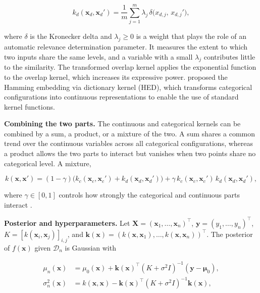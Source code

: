 \begin{equation}
  k_d(\boldsymbol{x}_d, \boldsymbol{x}_d') = \frac{1}{m} \sum_{j=1}^{m} \lambda_j \, \delta\big(x_{d,j},\, x_{d,j}'\big),
  \label{eq:kernel-discrete}
\end{equation}

where $\delta$ is the Kronecker delta and $\lambda_j \ge 0$ is a weight that plays the role of an automatic relevance determination parameter. It measures the extent to which two inputs share the same levels, and a variable with a small $\lambda_j$ contributes little to the similarity. The transformed overlap kernel \citep{pmlr-v139-wan21b} applies the exponential function to the overlap kernel, which increases its expressive power. \citet{pmlr-v206-deshwal23a} proposed the Hamming embedding via dictionary kernel (HED), which transforms categorical configurations into continuous representations to enable the use of standard kernel functions. %

\textbf{Combining the two parts.} The continuous and categorical kernels can be combined by a sum, a product, or a mixture of the two. A sum shares a common trend over the continuous variables across all categorical configurations, whereas a product allows the two parts to interact but vanishes when two points share no categorical level. A mixture,

\begin{equation}
  k(\boldsymbol{x}, \boldsymbol{x}') = (1-\gamma)\big(k_c(\boldsymbol{x}_c, \boldsymbol{x}_c') + k_d(\boldsymbol{x}_d, \boldsymbol{x}_d')\big) + \gamma\, k_c(\boldsymbol{x}_c, \boldsymbol{x}_c')\, k_d(\boldsymbol{x}_d, \boldsymbol{x}_d'),
  \label{eq:kernel-mixed}
\end{equation}

where $\gamma \in [0,1]$ controls how strongly the categorical and continuous parts interact \citep{pmlr-v119-ru20a}.

\textbf{Posterior and hyperparameters.} Let $\boldsymbol{X} = (\boldsymbol{x}_1, \dots, \boldsymbol{x}_n)^\top$, $\boldsymbol{y} = (y_1, \dots, y_n)^\top$, $K = [k(\boldsymbol{x}_i, \boldsymbol{x}_j)]_{i,j}$, and $\boldsymbol{k}(\boldsymbol{x}) = (k(\boldsymbol{x}, \boldsymbol{x}_1), \dots, k(\boldsymbol{x}, \boldsymbol{x}_n))^\top$. The posterior of $f(\boldsymbol{x})$ given $\mathcal{D}_n$ is Gaussian with

\begin{align}
  \mu_n(\boldsymbol{x}) &= \mu_0(\boldsymbol{x}) + \boldsymbol{k}(\boldsymbol{x})^\top (K + \sigma^2 I)^{-1} (\boldsymbol{y} - \boldsymbol{\mu}_0), \label{eq:gp-posterior-mean} \\
  \sigma_n^2(\boldsymbol{x}) &= k(\boldsymbol{x}, \boldsymbol{x}) - \boldsymbol{k}(\boldsymbol{x})^\top (K + \sigma^2 I)^{-1} \boldsymbol{k}(\boldsymbol{x}), \label{eq:gp-posterior-variance}
\end{align}

